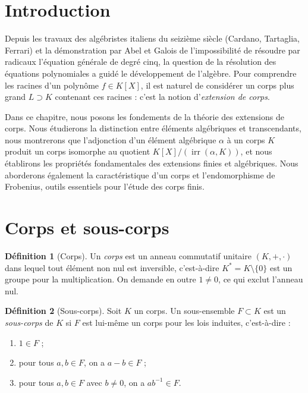 \documentclass[12pt,a4paper,openany]{book}
\theoremstyle{definition}
\newtheorem{definition}{Définition}[chapter]
\newcommand{\irr}{\operatorname{irr}}
\begin{document}
\section*{Introduction}

Depuis les travaux des algébristes italiens du seizième siècle (Cardano, Tartaglia,
Ferrari) et la démonstration par Abel et Galois de l'impossibilité de résoudre par
radicaux l'équation générale de degré cinq, la question de la résolution des
équations polynomiales a guidé le développement de l'algèbre. Pour comprendre les
racines d'un polynôme $f \in K[X]$, il est naturel de considérer un corps plus
grand $L \supset K$ contenant ces racines : c'est la notion d'\emph{extension de
corps}.

Dans ce chapitre, nous posons les fondements de la théorie des extensions de corps.
Nous étudierons la distinction entre éléments algébriques et transcendants, nous
montrerons que l'adjonction d'un élément algébrique $\alpha$ à un corps $K$
produit un corps isomorphe au quotient $K[X]/(\irr(\alpha,K))$, et nous
établirons les propriétés fondamentales des extensions finies et algébriques. Nous
aborderons également la caractéristique d'un corps et l'endomorphisme de Frobenius,
outils essentiels pour l'étude des corps finis.

\section{Corps et sous-corps}
\label{sec:corps-sous-corps}

\begin{definition}[Corps]\label{def:corps}
Un \emph{corps} est un anneau commutatif unitaire $(K, +, \cdot)$ dans lequel
tout élément non nul est inversible, c'est-à-dire $K^* = K \setminus \{0\}$
est un groupe pour la multiplication. On demande en outre $1 \neq 0$, ce qui
exclut l'anneau nul.
\end{definition}

\begin{definition}[Sous-corps]\label{def:sous-corps}
Soit $K$ un corps. Un sous-ensemble $F \subset K$ est un \emph{sous-corps} de
$K$ si $F$ est lui-même un corps pour les lois induites, c'est-à-dire :
\begin{enumerate}[label=(\roman*)]
  \item $1 \in F$ ;
  \item pour tous $a, b \in F$, on a $a - b \in F$ ;
  \item pour tous $a, b \in F$ avec $b \neq 0$, on a $ab^{-1} \in F$.
\end{enumerate}
\end{definition}
\end{document}
